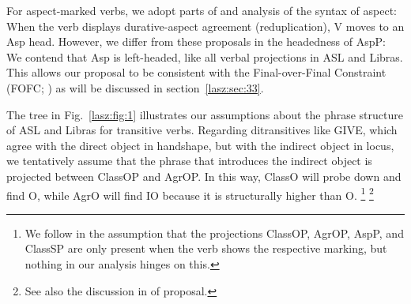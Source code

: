 \documentclass[output=paper,colorlinks,citecolor=brown,
]{langscibook}
\begin{document}
For aspect-marked verbs, we adopt parts of 
and  analysis of the syntax of aspect: When the verb
displays durative-aspect agreement (reduplication), V moves to an Asp
head. However, we differ from these proposals in the headedness of
AspP: We contend that Asp is left-headed, like all verbal projections in
ASL and Libras. This allows our proposal to be consistent with the
Final-over-Final Constraint (FOFC; \citealp{BiberauerHR.2014,SheehanBRH.2017}) 
as will be discussed in section~\ref{lasz:sec:33}.

The tree in Fig.~\ref{lasz:fig:1} illustrates our assumptions about the phrase
structure of ASL and Libras for transitive verbs. Regarding
ditransitives like GIVE, which agree with the direct object in
handshape, but with the indirect object in locus, we tentatively assume
that the phrase that introduces the indirect object is projected between 
ClassOP and AgrOP. In this way, ClassO will probe down and find O,
while AgrO will find IO because it is structurally higher than O.%
\footnote{
    We follow \citet{Quadros.etal.2004} in the assumption that the projections
    ClassOP, AgrOP, AspP, and ClassSP are only present when the verb shows the respective marking,
    but nothing in our analysis hinges on this.
}%
\footnote{
    See also the discussion in \citet{Pfau.etal.2018} of  proposal.
}
\end{document}
